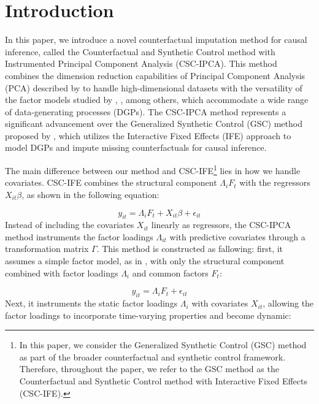 \documentclass[12pt]{article}
\begin{document}
\section{Introduction} 
\label{sec: introduction}
In this paper, we introduce a novel counterfactual imputation method for causal inference, called the Counterfactual and Synthetic Control method with Instrumented Principal Component Analysis (CSC-IPCA). This method combines the dimension reduction capabilities of Principal Component Analysis (PCA) described by \cite{jollife2016principal} to handle high-dimensional datasets with the versatility of the factor models studied by \cite{bai2003computation}, \cite{bai2009panel}, among others, which accommodate a wide range of data-generating processes (DGPs). The CSC-IPCA method represents a significant advancement over the Generalized Synthetic Control (GSC) method proposed by \cite{xu2017generalized}, which utilizes the Interactive Fixed Effects (IFE) approach to model DGPs and impute missing counterfactuals for causal inference.

The main difference between our method and CSC-IFE\footnote{In this paper, we consider the Generalized Synthetic Control (GSC) method as part of the broader counterfactual and synthetic control framework. Therefore, throughout the paper, we refer to the GSC method as the Counterfactual and Synthetic Control method with Interactive Fixed Effects (CSC-IFE).} lies in how we handle covariates. CSC-IFE combines the structural component $\Lambda_i F_t$ with the regressors $X_{it} \beta$, as shown in the following equation:

\begin{equation}
\label{eqn: ife}
y_{it} = \Lambda_i F_t + X_{it} \beta + \epsilon_{it}
\end{equation}
Instead of including the covariates $X_{it}$ linearly as regressors, the CSC-IPCA method instruments the factor loadings $\Lambda_{it}$ with predictive covariates through a transformation matrix $\Gamma$. This method is constructed as fallowing: first, it assumes a simple factor model, as in \cite{bai2003computation}, with only the structural component combined with factor loadings $\Lambda_i$ and common factors $F_t$:

\begin{equation}
\label{eqn: fe}
y_{it} = \Lambda_i F_t + \epsilon_{it}
\end{equation}
Next, it instruments the static factor loadings $\Lambda_i$ with covariates $X_{it}$, allowing the factor loadings to incorporate time-varying properties and become dynamic:
\end{document}
